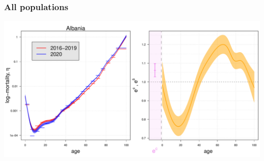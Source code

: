 \documentclass[table,xcdraw,dvipsnames,handout]{beamer}
\begin{document}
\begin{frame}[fragile]\frametitle{All populations}
	\begin{center}
		\includegraphics[scale=.26, page=67]{Figures/All.pdf}
	\end{center}
\end{frame}
\end{document}
